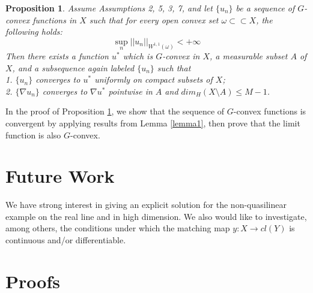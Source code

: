 \documentclass[a4paper, 11pt]{amsart}
\numberwithin{equation}{section}
\theoremstyle{plain}
\newtheorem{proposition}[theorem]{Proposition}
\theoremstyle{definition}
\theoremstyle{remark}
\begin{document}
\begin{proposition}\label{proposition:convergence}
	Assume Assumptions 2, 5, 3, 7, and let $\{u_n\}$ be a sequence of $G$-convex functions in $X$ such that for every open convex set $\omega \subset \subset X$, the following holds:
	\begin{equation*}
	\sup\limits_{n} ||u_n||_{W^{1,1}(\omega )} < +\infty
	\end{equation*}
	Then there exists a function $u^*$ which is  $G$-convex in $X$, a measurable subset $A$ of $X$, and a subsequence again labeled $\{u_n\}$ such that\\
	1. $\{u_n\}$ converges to $u^*$ uniformly on compact subsets of $X$;\\
	2. $\{\nabla u_n\}$ converges to $\nabla u^*$ pointwise in $A$ and $dim_{H}(X\setminus A)\le M-1$.
\end{proposition}

In the proof of Proposition \ref{proposition:convergence}, we show that the sequence of $G$-convex functions is convergent by applying results from Lemma \ref{lemma1}, then prove that the limit function is also $G$-convex. \medskip



\bigskip





\section{Future Work}\label{section:futurework}

We have strong interest in giving an explicit solution for the non-quasilinear example on the real line and in high dimension. We also would like to investigate, among others, the conditions under which the matching map $y: X \rightarrow cl(Y)$ is continuous and/or differentiable. 




\bigskip



\section{Proofs}\label{section:proofs}
\end{document}
